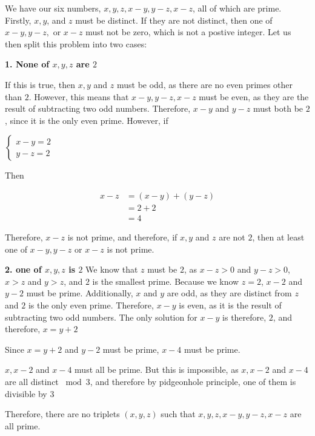 \documentclass[11pt]{article}
\begin{document}
\begin{solution}{2}
We have our six numbers, $x, y, z, x-y, y-z, x-z$, all of which are prime.
Firstly, $x, y$, and $z$ must be distinct. If they are not distinct, then one 
of $x-y, y-z,$ or $x-z$ must not be zero, which is not a postive integer.
Let us then split this problem into two cases:

\textbf{1. None of $x, y, z$ are $2$}

If this is true, then $x, y$ and $z$ must be odd, as there are no even primes 
other than $2$.
However, this means that $x-y, y-z, x-z$ must be even, as they are the result 
of subtracting two odd numbers.
Therefore, $x-y$ and $y-z$ must both be $2$, since it is the only even prime.
However, if

\begin{center}
$\begin{cases} x-y = 2 \\ y - z = 2 \end{cases}$
\end{center}


Then

\begin{align*}
x - z &= (x - y) + (y - z)\\
&= 2 + 2\\
&= 4
\end{align*}

Therefore, $x-z$ is not prime, and therefore, if $x, y$ and $z$ are not $2$, 
then at least one of $x-y, y-z$ or $x-z$ is not prime.

\textbf{2. one of $x, y, z$ is $2$}
We know that $z$ must be $2$, as $x-z > 0$ and $y-z > 0$, $x > z$ and $y > z$, 
and $2$ is the smallest prime.
Because we know $z = 2$, $x-2$ and $y-2$ must be prime. Additionally, $x$ and 
$y$ are odd, as they are distinct from $z$ and $2$ is the only even prime. 
Therefore, $x-y$ is even, as it is the result of subtracting two odd numbers. 
The only solution for $x-y$ is therefore, $2$, and therefore, $x = y + 2$

Since $x = y + 2$ and $y-2$ must be prime, $x-4$ must be prime. 

$x, x-2$ and $x-4$ must all be prime. But this is impossible, as $x, x-2$ and 
$x-4$ are all distinct $\bmod{3}$, and therefore by pidgeonhole principle, one 
of them is divisible by $3$

Therefore, there are no triplets $(x, y, z)$ such that $x, y, z, x-y, y-z, x-z$ 
are all prime.

\end{solution}
\end{document}
